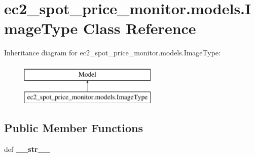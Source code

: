 \hypertarget{classec2__spot__price__monitor_1_1models_1_1ImageType}{\section{ec2\-\_\-spot\-\_\-price\-\_\-monitor.\-models.\-Image\-Type Class Reference}
\label{classec2__spot__price__monitor_1_1models_1_1ImageType}
}
Inheritance diagram for ec2\-\_\-spot\-\_\-price\-\_\-monitor.\-models.\-Image\-Type\-:\begin{figure}[H]
\begin{center}
\leavevmode
\includegraphics[height=2.000000cm]{classec2__spot__price__monitor_1_1models_1_1ImageType}
\end{center}
\end{figure}
\subsection*{Public Member Functions}
\begin{DoxyCompactItemize}
\item 
\hypertarget{classec2__spot__price__monitor_1_1models_1_1ImageType_aff337c862daed3762c4eb04eefd1df7e}{def {\bfseries \-\_\-\-\_\-str\-\_\-\-\_\-}}\label{classec2__spot__price__monitor_1_1models_1_1ImageType_aff337c862daed3762c4eb04eefd1df7e}

\end{DoxyCompactItemize}
